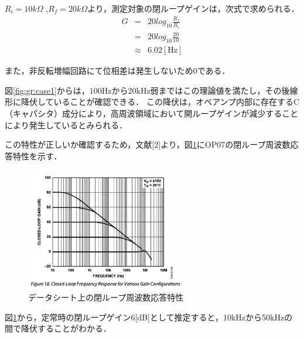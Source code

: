 \documentclass[dvipdfmx,titlepage,a4j]{jsarticle}  %
\begin{document}
$R_i = 10k\Omega$ ,$R_f = 20k\Omega$より，測定対象の閉ループゲインは，次式で求められる．
\begin{eqnarray}
  G &=& 20 log_{10} \frac{R_f}{R_i}\\
  &=& 20 log_{10} \frac{20}{10}\\
  &\approx& 6.02 \mathrm{[Hz]}
\end{eqnarray}

また，非反転増幅回路にて位相差は発生しないため0である．

図\ref{fig:gr:case1}からは，$100$Hzから$20$kHz弱まではこの理論値を満たし，その後線形に降伏していることが確認できる．
この降伏は，オペアンプ内部に存在するC（キャパシタ）成分により，高周波領域において開ループゲインが減少することにより発生しているとみられる．

この特性が正しいか確認するため，文献[2]より，図\ref{fig:16}にOP07の閉ループ周波数応答特性を示す．
\begin{figure}[H]
  \begin{center}
      \includegraphics[width=7cm]{../image/fig16.png}
      \caption{データシート上の閉ループ周波数応答特性}
      \label{fig:16}
  \end{center}
\end{figure}
図\ref{fig:16}から，定常時の閉ループゲイン6[dB]として推定すると，10kHzから50kHzの間で降伏することがわかる．
\end{document}
